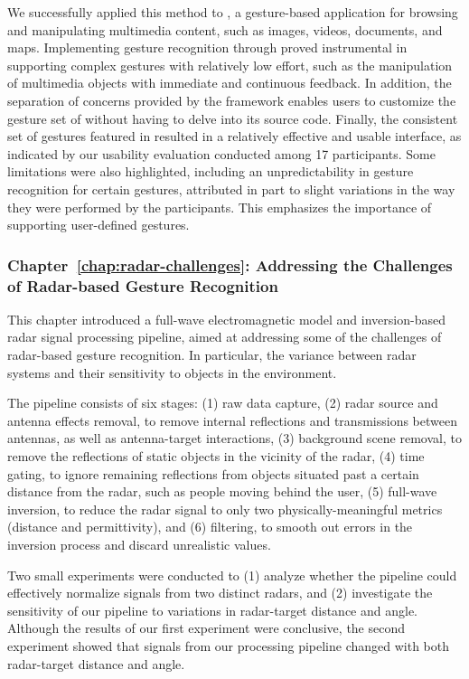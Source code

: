 We successfully applied this method to \lui, a gesture-based application for browsing and manipulating multimedia content, such as images, videos, documents, and maps. 
%
Implementing gesture recognition through \ql proved instrumental in supporting complex gestures with relatively low effort, such as the manipulation of multimedia objects with immediate and continuous feedback. In addition, the separation of concerns provided by the framework enables users to customize the gesture set of \lui without having to delve into its source code.
%
Finally, the consistent set of gestures featured in \lui resulted in a relatively effective and usable interface, as indicated by our usability evaluation conducted among 17 participants. Some limitations were also highlighted, including an unpredictability in gesture recognition for certain gestures, attributed in part to slight variations in the way they were performed by the participants. This emphasizes the importance of supporting user-defined gestures.

\subsubsection{Chapter~\ref{chap:radar-challenges}: Addressing the Challenges of Radar-based Gesture Recognition}
This chapter introduced a full-wave electromagnetic model and inversion-based~\cite{Lambot:2004,Lambot:2014} radar signal processing pipeline, aimed at addressing some of the challenges of radar-based gesture recognition. In particular, the variance between radar systems and their sensitivity to objects in the environment.

The pipeline consists of six stages: (1) raw data capture, (2) radar source and antenna effects removal, to remove internal reflections and transmissions between antennas, as well as antenna-target interactions, (3) background scene removal, to remove the reflections of static objects in the vicinity of the radar, (4) time gating, to ignore remaining reflections from objects situated past a certain distance from the radar, such as people moving behind the user, (5) full-wave inversion, to reduce the radar signal to only two physically-meaningful metrics (distance and permittivity), and (6) filtering, to smooth out errors in the inversion process and discard unrealistic values.

Two small experiments were conducted to (1) analyze whether the pipeline could effectively normalize signals from two distinct radars, and (2) investigate the sensitivity of our pipeline to variations in radar-target distance and angle.
%
Although the results of our first experiment were conclusive, the second experiment showed that signals from our processing pipeline changed with both radar-target distance and angle.  

